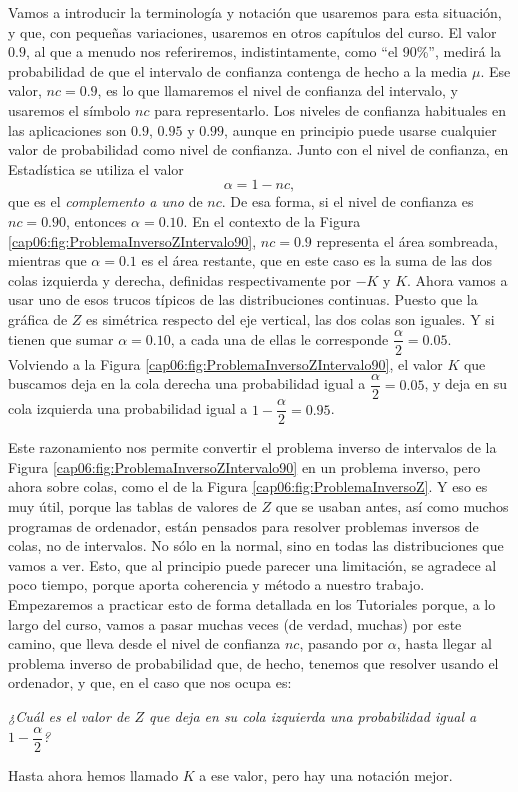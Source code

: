 Vamos a introducir la terminología y notación que usaremos para esta situación,
y que, con pequeñas variaciones, usaremos en otros capítulos del curso. El
valor $0.9$, al que a menudo nos referiremos, indistintamente, como ``el
90\%'', medirá la probabilidad de que el intervalo de confianza contenga de
hecho a la media $\mu$. Ese valor, $nc=0.9$, es lo que llamaremos el {\sf nivel
de confianza} del
intervalo, y usaremos el símbolo $nc$ para representarlo. Los niveles de
confianza habituales en las aplicaciones son $0.9$, $0.95$ y $0.99$, aunque en
principio puede usarse cualquier valor de probabilidad como nivel de confianza.
Junto con el nivel de confianza, en Estadística se utiliza el
valor
\[\alpha=1-nc,\]
que es el {\em complemento a uno} de $nc$. De esa forma, si el nivel de
confianza es $nc=0.90$, entonces $\alpha=0.10$. En el contexto de la Figura
\ref{cap06:fig:ProblemaInversoZIntervalo90}, $nc=0.9$ representa el área
sombreada, mientras que $\alpha=0.1$ es el área restante, que en este caso es
la suma de las dos colas izquierda y derecha, definidas respectivamente por
$-K$ y $K$. Ahora vamos a usar uno de esos trucos típicos de las distribuciones
continuas. Puesto que la gráfica de $Z$ es simétrica respecto del eje vertical,
las dos colas son iguales. Y si tienen que sumar $\alpha=0.10$, a cada una de
ellas le corresponde $\dfrac{\alpha}{2}=0.05$. Volviendo a la Figura
\ref{cap06:fig:ProblemaInversoZIntervalo90}, el valor $K$ que buscamos deja en
la cola derecha una probabilidad igual a $\dfrac{\alpha}{2}=0.05$, y deja en su
cola izquierda una probabilidad igual a $1-\dfrac{\alpha}{2}=0.95$.

Este razonamiento nos permite convertir el problema inverso de intervalos de la
Figura \ref{cap06:fig:ProblemaInversoZIntervalo90} en un problema inverso, pero
ahora sobre colas, como el de la Figura \ref{cap06:fig:ProblemaInversoZ}. Y eso
es muy útil, porque las tablas de valores de $Z$ que se usaban antes,
así como muchos programas de ordenador, están pensados para resolver problemas
inversos de colas, no de intervalos. No sólo en la normal, sino en todas las distribuciones que
vamos a ver. Esto, que al principio puede parecer una limitación, se agradece
al poco tiempo, porque aporta coherencia y método a nuestro trabajo.
Empezaremos a practicar esto de forma detallada en los Tutoriales porque, a lo
largo del curso, vamos a pasar muchas veces (de verdad, muchas) por este camino,
que lleva desde el nivel de confianza $nc$, pasando por $\alpha$, hasta llegar
al problema inverso de probabilidad que, de hecho, tenemos que resolver usando
el ordenador, y que, en el caso que nos ocupa es:
\begin{center}
{\em ¿Cuál es el valor de $Z$ que deja en su cola izquierda una probabilidad
igual a $1-\dfrac{\alpha}{2}$?}
\end{center}
Hasta ahora hemos llamado $K$ a ese valor, pero hay una notación mejor.

